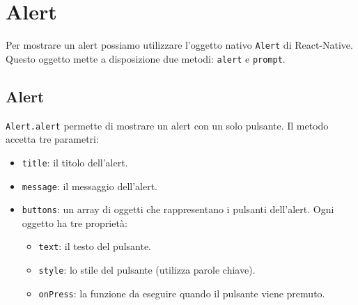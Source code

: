 \documentclass[12pt]{article}
\begin{document}
\pagebreak
\section{Alert}
Per mostrare un alert possiamo utilizzare l'oggetto nativo
\texttt{Alert} di React-Native. Questo oggetto mette a disposizione
due metodi: \texttt{alert} e \texttt{prompt}.

\subsection{Alert}
\texttt{Alert.alert} permette di mostrare un alert con un 
solo pulsante. Il metodo accetta tre parametri:
\begin{itemize}
\item \texttt{title}: il titolo dell'alert.
\item \texttt{message}: il messaggio dell'alert.    
\item \texttt{buttons}: un array di oggetti che rappresentano 
i pulsanti dell'alert. Ogni oggetto ha tre proprietà:
\begin{itemize}
\item \texttt{text}: il testo del pulsante.
\item \texttt{style}: lo stile del pulsante (utilizza parole chiave).
\item \texttt{onPress}: la funzione da eseguire quando il pulsante viene premuto.
\end{itemize}
\end{itemize}
\end{document}
